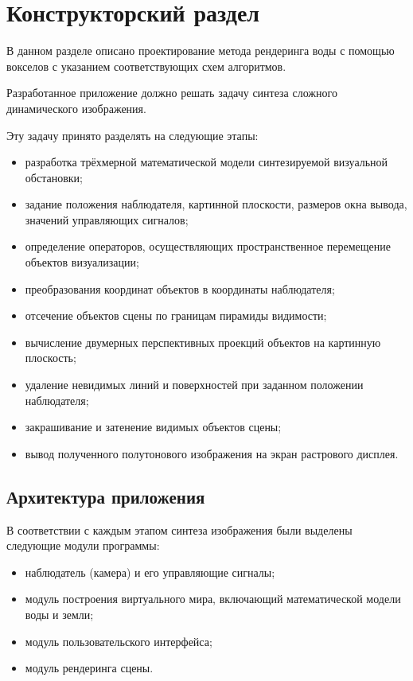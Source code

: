 \chapter{Конструкторский раздел}
\label{cha:design}

В данном разделе описано проектирование метода рендеринга воды с помощью вокселов
с указанием соответствующих схем алгоритмов.

Разработанное приложение должно решать задачу синтеза сложного динамического изображения.

Эту задачу принято разделять на следующие этапы:
\begin{itemize}
    \item разработка трёхмерной математической модели синтезируемой визуальной
    обстановки;
    \item задание положения наблюдателя, картинной плоскости, размеров окна
    вывода, значений управляющих сигналов;
    \item определение операторов, осуществляющих пространственное перемещение
    объектов визуализации;
    \item преобразования координат объектов в координаты наблюдателя;
    \item отсечение объектов сцены по границам пирамиды видимости;
    \item вычисление двумерных перспективных проекций объектов на картинную плоскость;
    \item удаление невидимых линий и поверхностей при заданном положении наблюдателя;
    \item закрашивание и затенение видимых объектов сцены;
    \item вывод полученного полутонового изображения на экран растрового дисплея.
\end{itemize}

\section{Архитектура приложения}

В соответствии с каждым этапом синтеза изображения были выделены следующие модули программы:
\begin{itemize}
    \item наблюдатель (камера) и его управляющие сигналы;
    \item модуль построения виртуального мира, включающий математической модели воды и земли;
    \item модуль пользовательского интерфейса;
    \item модуль рендеринга сцены.
\end{itemize}

